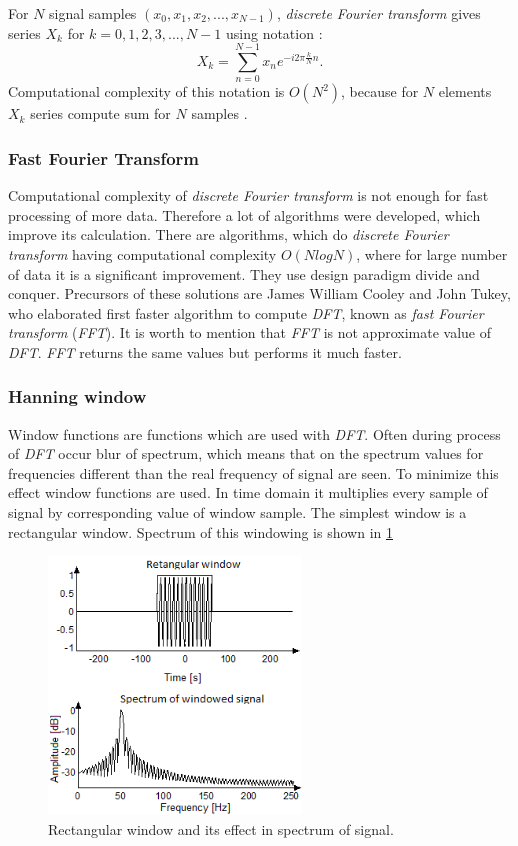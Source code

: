 \documentclass[11pt,titlepage]{article}
\theoremstyle{plain}
\begin{document}
For $N$ signal samples $(x_0,x_1,x_2,...,x_{N-1})$, \textit{discrete Fourier transform} gives series $X_k$ for $k = 0,1, 2, 3, ..., N-1$ using notation \cite{fourier}:
\begin{equation}
	X_k =  \sum\limits_{n=0}^{N-1} x_ne^{-i2\pi \frac{k}{N}n}.
\end{equation}
Computational complexity of this notation is $O(N^2)$, because for $N$ elements $X_k$ series compute sum for $N$ samples \cite{fast_fourier}.

\subsubsection{Fast Fourier Transform}
Computational complexity of \textit{discrete Fourier transform} is not enough for fast processing of more data. Therefore a lot of algorithms were developed, which improve its calculation. There are algorithms, which do \textit{discrete Fourier transform} having computational complexity $O(NlogN)$, where for large number of data it is a significant improvement. They use design paradigm divide and conquer. Precursors of these solutions are James William Cooley and John Tukey, who elaborated first faster algorithm to compute \textit{DFT}, known as \textit{fast Fourier transform} (\textit{FFT}). It is worth to mention that \textit{FFT} is not approximate value of \textit{DFT}. \textit{FFT} returns the same values but performs it much faster.

\subsubsection{Hanning window}
Window functions are functions which are used with \textit{DFT}. Often during process of \textit{DFT} occur blur of spectrum, which means that on the spectrum values for frequencies different than the real frequency of signal are seen. To minimize this effect window functions are used. In time domain it multiplies every sample of signal by corresponding value of window sample. The simplest window is a rectangular window. Spectrum of this windowing is shown in \ref{fig:F9}
\begin{figure}[H]
	\centering
	\includegraphics[width=0.6\textwidth]{img/rectangular_window}
	\caption{Rectangular window and its effect in spectrum of signal.}
	\label{fig:F9}
\end{figure}
\end{document}
